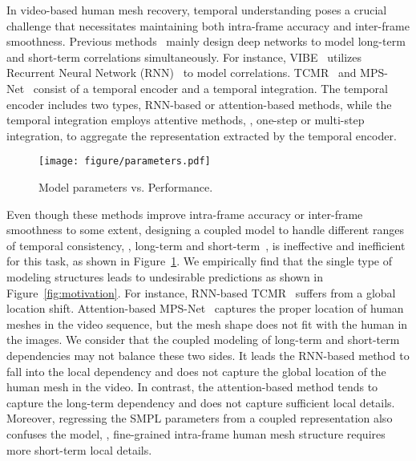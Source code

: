 \documentclass[10pt,twocolumn,letterpaper]{article}
\begin{document}
In video-based human mesh recovery, temporal understanding poses a crucial challenge that necessitates maintaining both intra-frame accuracy and inter-frame smoothness. 
 Previous methods~\cite{VIBE,TCMR,MPS-net} mainly design deep networks to model long-term and short-term correlations simultaneously. For instance, VIBE~\cite{VIBE} utilizes Recurrent Neural Network (RNN)~\cite{GRU} to model correlations. TCMR~\cite{TCMR} and MPS-Net~\cite{MPS-net} consist of a temporal encoder and a temporal integration. The temporal encoder includes two types, RNN-based or attention-based methods, while the temporal integration employs attentive methods, \ie, one-step or multi-step integration, to aggregate the representation extracted by the temporal encoder.
	
	\begin{figure}[!t]
		\centering
		\texttt{[image: figure/parameters.pdf]}
		\vspace{-0.7 em}
		\caption{
			Model parameters vs. Performance.
		}
		\vspace{-0.8 em}
		\label{fig:para}
		\vspace{-1.0 em}
	\end{figure}
	
	Even though these methods improve intra-frame accuracy or inter-frame smoothness to some extent, designing a coupled model to handle different ranges of temporal consistency, \ie, long-term and short-term~\cite{yang2021collaborative,yang2021associating}, is ineffective and inefficient for this task, as shown in Figure~\ref{fig:para}.
	We empirically find that the single type of modeling structures leads to undesirable predictions as shown in Figure~\ref{fig:motivation}. For instance, RNN-based TCMR~\cite{TCMR} suffers from a global location shift. Attention-based MPS-Net~\cite{MPS-net} captures the proper location of human meshes in the video sequence, but the mesh shape does not fit with the human in the images.
	We consider that the coupled modeling of long-term and short-term dependencies may not balance these two sides. It leads the RNN-based method to fall into the local dependency and does not capture the global location of the human mesh in the video. In contrast, the attention-based method tends to capture the long-term dependency and does not capture sufficient local details.
	Moreover, regressing the SMPL parameters from a coupled representation also confuses the model, \eg, fine-grained intra-frame human mesh structure requires more short-term local details. 
	
\end{document}
